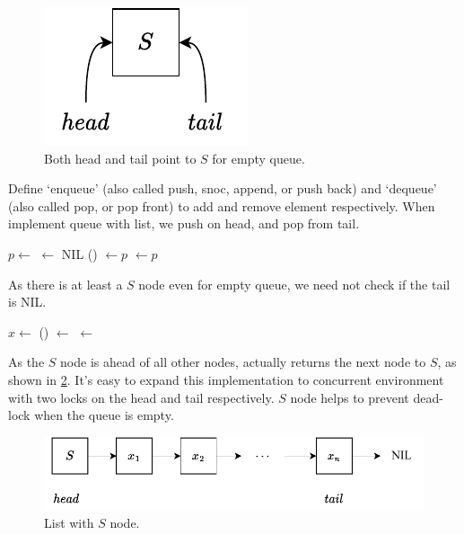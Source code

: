 \documentclass[b5paper]{article}
\begin{document}
\begin{figure}[htbp]
  \centering
  \includegraphics[scale=0.8]{img/empty-list}
  \caption{Both head and tail point to $S$ for empty queue.}
  \label{fig:empty-list}
\end{figure}

Define `enqueue' (also called push, snoc, append, or push back) and `dequeue' (also called pop, or pop front) to add and remove element respectively. When implement queue with list, we push on head, and pop from tail.

\begin{algorithmic}[1]
  \State $p \gets $ 
  \State {} $\gets$ NIL
  \State {}() $\gets p$
  \State {} $\gets p$
\EndFunction
\end{algorithmic}

As there is at least a $S$ node even for empty queue, we need not check if the tail is NIL.

\begin{algorithmic}[1]
  \State $x \gets $ 
  \State {}() $\gets$ 
   
    \State {} $\gets$ 
  \EndIf
  \State \Return {}
\EndFunction
\end{algorithmic}

As the $S$ node is ahead of all other nodes,  actually returns the next node to $S$, as shown in \cref{fig:list-queue}. It's easy to expand this implementation to concurrent environment with two locks on the head and tail respectively. $S$ node helps to prevent dead-lock when the queue is empty\cite{PODC96}\cite{SutterDDJ}.

\begin{figure}[htbp]
  \centering
  \includegraphics[scale=0.8]{img/slistq}
  \caption{List with $S$ node.}
  \label{fig:list-queue}
\end{figure}
\end{document}
